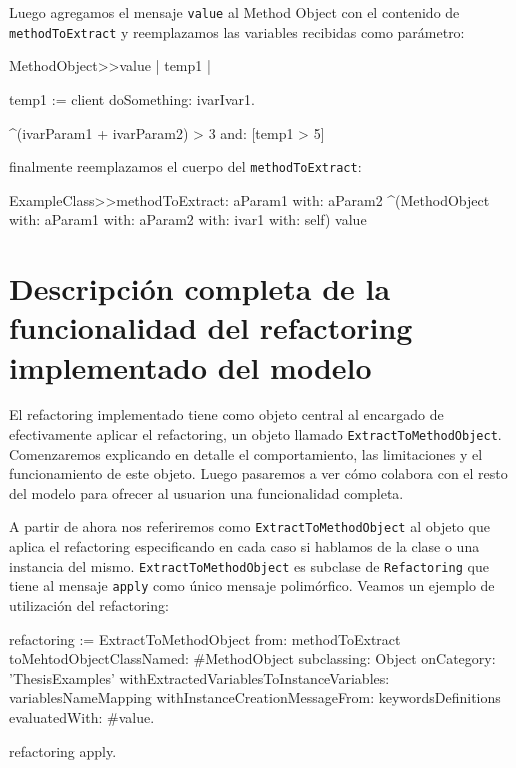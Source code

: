 Luego agregamos el mensaje \lstinline{value} al Method Object con el contenido
de \lstinline{methodToExtract} y reemplazamos las variables recibidas como
parámetro:

\begin{code}
MethodObject>>value | temp1 |

    temp1 := client doSomething: ivarIvar1.

    ^(ivarParam1 + ivarParam2) > 3 and: [temp1 > 5]
\end{code}

finalmente reemplazamos el cuerpo del \lstinline{methodToExtract}:

\begin{code}
ExampleClass>>methodToExtract: aParam1 with: aParam2 ^(MethodObject with:
aParam1 with: aParam2 with: ivar1 with: self) value
\end{code}



\section{Descripción completa de la funcionalidad del refactoring implementado del modelo}


El refactoring implementado tiene como objeto central al encargado de
efectivamente aplicar el refactoring, un objeto llamado
\lstinline{ExtractToMethodObject}. Comenzaremos explicando en detalle el
comportamiento, las limitaciones y el funcionamiento de este objeto. Luego
pasaremos a ver cómo colabora con el resto del modelo para ofrecer al usuarion
una funcionalidad completa.

A partir de ahora nos referiremos como \lstinline{ExtractToMethodObject} al
objeto que aplica el refactoring especificando en cada caso si hablamos de la
clase o una instancia del mismo. \lstinline{ExtractToMethodObject} es subclase
de \lstinline{Refactoring} que tiene al mensaje \lstinline{apply} como único
mensaje polimórfico.
Veamos un ejemplo de utilización del refactoring:

\begin{code}
refactoring := ExtractToMethodObject from: methodToExtract
toMehtodObjectClassNamed: #MethodObject subclassing: Object onCategory:
'ThesisExamples' withExtractedVariablesToInstanceVariables: variablesNameMapping
withInstanceCreationMessageFrom: keywordsDefinitions evaluatedWith: #value.

refactoring apply.
\end{code}

